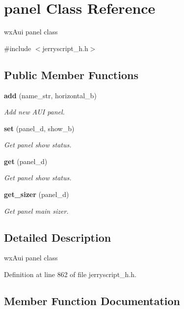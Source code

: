 \section{panel Class Reference}
\label{classpanel}


wx\+Aui panel class  




{\ttfamily \#include $<$jerryscript\+\_\+h.\+h$>$}

\subsection*{Public Member Functions}
\begin{DoxyCompactItemize}
\item 
\textbf{ add} (name\+\_\+str, horizontal\+\_\+b)
\begin{DoxyCompactList}\small\item\em Add new A\+UI panel. \end{DoxyCompactList}\item 
\textbf{ set} (panel\+\_\+d, show\+\_\+b)
\begin{DoxyCompactList}\small\item\em Get panel show status. \end{DoxyCompactList}\item 
\textbf{ get} (panel\+\_\+d)
\begin{DoxyCompactList}\small\item\em Get panel show status. \end{DoxyCompactList}\item 
\textbf{ get\+\_\+sizer} (panel\+\_\+d)
\begin{DoxyCompactList}\small\item\em Get panel main sizer. \end{DoxyCompactList}\end{DoxyCompactItemize}


\subsection{Detailed Description}
wx\+Aui panel class 

Definition at line 862 of file jerryscript\+\_\+h.\+h.



\subsection{Member Function Documentation}
\mbox{\label{classpanel_a5715748aa5935fb3b35c82b422d209e1}} 
